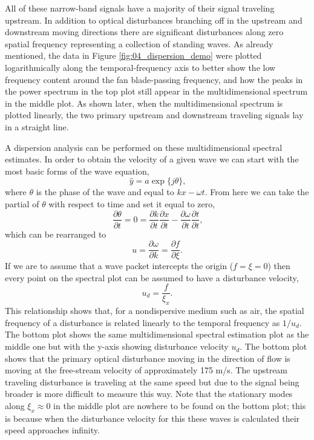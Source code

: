 All of these narrow-band signals have a majority of their signal traveling upstream.
In addition to optical disturbances branching off in the upstream and downstream moving directions there are significant disturbances along zero spatial frequency representing a collection of standing waves.
As already mentioned, the data in Figure \ref{fig:04_dispersion_demo} were plotted logarithmically along the temporal-frequency axis to better show the low frequency content around the fan blade-passing frequency, and how the peaks in the power spectrum in the top plot still appear in the multidimensional spectrum in the middle plot.
As shown later, when the multidimensional spectrum is plotted linearly, the two primary upstream and downstream traveling signals lay in a straight line.

A dispersion analysis can be performed on these multidimensional spectral estimates.
In order to obtain the velocity of a given wave we can start with the most basic forms of the wave equation,
\begin{equation}
  \hat{y} = a\exp\{j\theta\} \textrm{,}
\end{equation}
where $\theta$ is the phase of the wave and equal to $kx-\omega t$.
From here we can take the partial of $\theta$ with respect to time and set it equal to zero,
\begin{equation}
  \frac{\partial\theta}{\partial t} = 0 = \frac{\partial k}{\partial t}\frac{\partial x}{\partial t}-\frac{\partial \omega}{\partial t}\frac{\partial t}{\partial t} \textrm{,}
\end{equation}
which can be rearranged to
\begin{equation}
  u = \frac{\partial \omega}{\partial k} = \frac{\partial f}{\partial \xi} \textrm{.}
\end{equation}
If we are to assume that a wave packet intercepts the origin ($f=\xi=0$) then every point on the spectral plot can be assumed to have a disturbance velocity,
\begin{equation}
  u_{d} = \frac{f}{\xi_x} \textrm{.}
  \label{eqn:04_velocity_assumed}
\end{equation}
This relationship shows that, for a nondispersive medium such as air, the spatial frequency of a disturbance is related linearly to the temporal frequency as $1/u_d$.
The bottom plot shows the same multidimensional spectral estimation plot as the middle one but with the y-axis showing disturbance velocity $u_d$.
The bottom plot shows that the primary optical disturbance moving in the direction of flow is moving at the free-stream velocity of approximately 175 m/s.
The upstream traveling disturbance is traveling at the same speed but due to the signal being broader is more difficult to measure this way.
Note that the stationary modes along $\xi_x\approx0$ in the middle plot are nowhere to be found on the bottom plot; this is because when the disturbance velocity for this these waves is calculated their speed approaches infinity.

